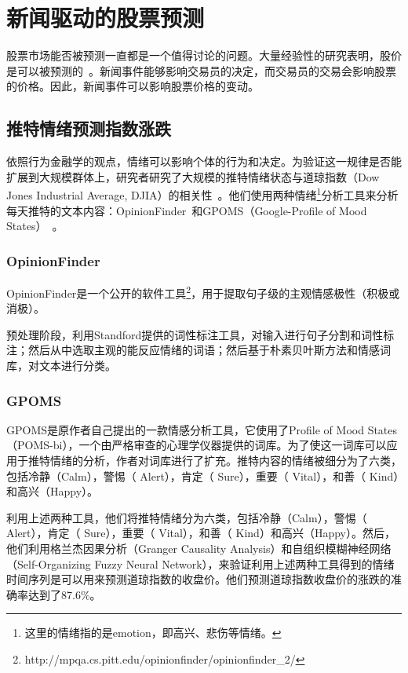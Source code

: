 \section{新闻驱动的股票预测}

股票市场能否被预测一直都是一个值得讨论的问题。大量经验性的研究表明，股价是可以被预测的~\cite{bollen2011twitter,ding2014using,ding2015deep,ding2016knowledge-driven}。新闻事件能够影响交易员的决定，而交易员的交易会影响股票的价格。因此，新闻事件可以影响股票价格的变动。

\subsection{推特情绪预测指数涨跌}
依照行为金融学的观点，情绪可以影响个体的行为和决定。为验证这一规律是否能扩展到大规模群体上，研究者研究了大规模的推特情绪状态与道琼指数（Dow Jones Industrial Average, DJIA）的相关性~\cite{bollen2011twitter}。他们使用两种情绪\footnote{这里的情绪指的是emotion，即高兴、悲伤等情绪。}分析工具来分析每天推特的文本内容：OpinionFinder~\cite{Wilson2005OpinionFinder}和GPOMS（Google-Profile of Mood States）~\cite{Spielberger1972Profile}。

\subsubsection{OpinionFinder}
OpinionFinder是一个公开的软件工具\footnote{http://mpqa.cs.pitt.edu/opinionfinder/opinionfinder\_2/}，用于提取句子级的主观情感极性（积极或消极）。

预处理阶段，利用Standford提供的词性标注工具，对输入进行句子分割和词性标注；然后从中选取主观的能反应情绪的词语；然后基于朴素贝叶斯方法和情感词库，对文本进行分类。

\subsubsection{GPOMS}

GPOMS是原作者自己提出的一款情感分析工具，它使用了Profile of Mood States（POMS-bi），一个由严格审查的心理学仪器提供的词库。为了使这一词库可以应用于推特情绪的分析，作者对词库进行了扩充。推特内容的情绪被细分为了六类，包括冷静（Calm），警惕（ Alert），肯定（ Sure），重要（ Vital），和善（ Kind）和高兴（Happy）。

利用上述两种工具，他们将推特情绪分为六类，包括冷静（Calm），警惕（ Alert），肯定（ Sure），重要（ Vital），和善（ Kind）和高兴（Happy）。然后，他们利用格兰杰因果分析（Granger Causality Analysis）和自组织模糊神经网络（Self-Organizing Fuzzy Neural Network），来验证利用上述两种工具得到的情绪时间序列是可以用来预测道琼指数的收盘价。他们预测道琼指数收盘价的涨跌的准确率达到了87.6\%。

